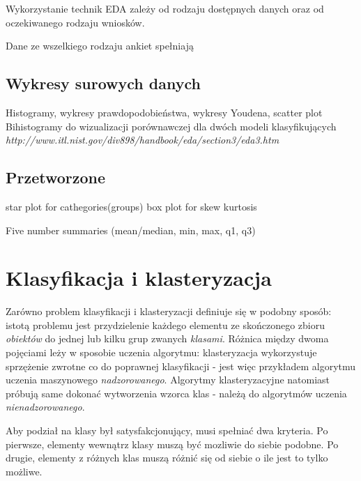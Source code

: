 \documentclass[12pt,a4paper,oneside]{report} %
\begin{document}
\cite{hseltman}

Wykorzystanie technik EDA zależy od rodzaju dostępnych danych oraz od oczekiwanego rodzaju wniosków.

Dane ze wszelkiego rodzaju ankiet spełniają

\subsection{Wykresy surowych danych}
Histogramy, wykresy prawdopodobieństwa, wykresy Youdena, scatter plot
Bihistogramy do wizualizacji porównawczej dla dwóch modeli klasyfikujących
\emph{http://www.itl.nist.gov/div898/handbook/eda/section3/eda3.htm}

\subsection{Przetworzone}
star plot for cathegories(groups)
box plot for
skew
kurtosis

Five number summaries (mean/median, min, max, q1, q3)

\section{Klasyfikacja i klasteryzacja}

Zarówno problem klasyfikacji i klasteryzacji definiuje się w podobny sposób: istotą problemu jest przydzielenie każdego elementu ze skończonego zbioru \emph{obiektów} do jednej lub kilku grup zwanych \emph{klasami}. Różnica między dwoma pojęciami leży w sposobie uczenia algorytmu: klasteryzacja wykorzystuje sprzężenie zwrotne co do poprawnej klasyfikacji - jest więc przykładem algorytmu uczenia maszynowego \emph{nadzorowanego}. Algorytmy klasteryzacyjne natomiast próbują same dokonać wytworzenia wzorca klas - należą do algorytmów uczenia \emph{nienadzorowanego}.\par

Aby podział na klasy był satysfakcjonujący, musi spełniać dwa kryteria. Po pierwsze, elementy wewnątrz klasy muszą być mozliwie do siebie podobne. Po drugie, elementy z różnych klas muszą różnić się od siebie o ile jest to tylko możliwe.\par
\end{document}
